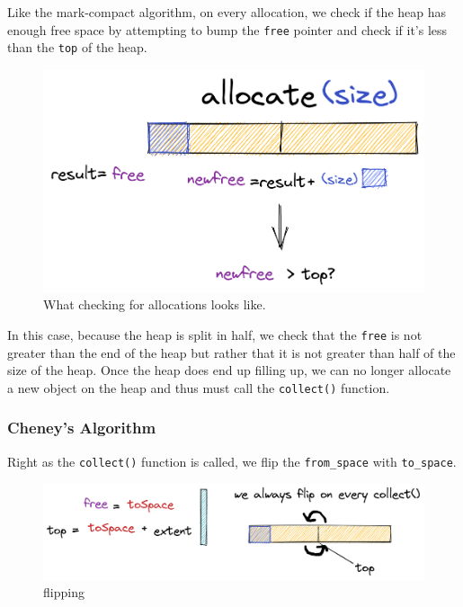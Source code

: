 \documentclass[index]{subfiles}
\begin{document}
Like the mark-compact algorithm, on every allocation, we check if the heap has enough free space by attempting to bump the \verb+free+ pointer and check if it's less than the \verb+top+ of the heap.

\begin{figure}[H]
    \centering
    \includegraphics[scale=0.3]{pics/allocation.png}
    \caption{What checking for allocations looks like.}
\end{figure}

In this case, because the heap is split in half, we check that the \verb+free+ is not greater than the end of the heap but rather that it is not greater than half of the size of the heap. Once the heap does end up filling up, we can no longer allocate a new object on the heap and thus must call the \verb+collect()+ function.

\subsubsection{Cheney's Algorithm}

Right as the \verb+collect()+ function is called, we flip the \verb+from_space+ with \verb+to_space+. 

\begin{figure}[H]
    \centering
    \includegraphics[scale=0.25]{pics/flipping.png}
    \caption{flipping}
\end{figure}
\end{document}
